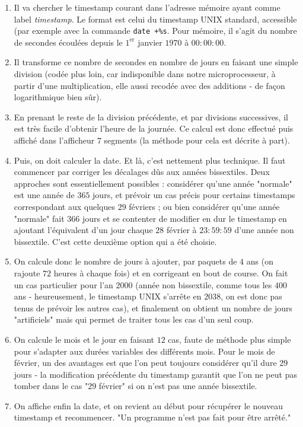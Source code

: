 \documentclass[13pt]{article}
\begin{document}
\begin{enumerate}
\item Il va chercher le timestamp courant dans l'adresse mémoire ayant comme label
   \emph{timestamp}. Le format est celui du timestamp UNIX standard, accessible (par
   exemple avec la commande \texttt{date +\%s}. Pour mémoire, il s'agit du nombre de
   secondes écoulées depuis le $1^{\text{er}}$ janvier $1970$ à $00:00:00$.\\
\item Il transforme ce nombre de secondes en nombre de jours en faisant une simple
   division (codée plus loin, car indisponible dans notre microprocesseur, à
   partir d'une multiplication, elle aussi recodée avec des additions - de façon
   logarithmique bien sûr).\\
\item En prenant le reste de la division précédente, et par divisions successives,
   il est très facile d'obtenir l'heure de la journée. Ce calcul est donc
   effectué puis affiché dans l'afficheur $7$ segments (la méthode pour cela est
   décrite à part).\\
\item Puis, on doit calculer la date. Et là, c'est nettement plus technique. Il
   faut commencer par corriger les décalages dûs aux années bissextiles. Deux
   approches sont essentiellement possibles : considérer qu'une année "normale"
   est une année de $365$ jours, et prévoir un cas précis pour certains timestamps
   correspondant aux quelques $29$ févriers ; ou bien considérer qu'une année
   "normale" fait $366$ jours et se contenter de modifier en dur le timestamp en
   ajoutant l'équivalent d'un jour chaque $28$ février à $23:59:59$ d'une année non
   bissextile. C'est cette deuxième option qui a été choisie.\\
\item On calcule donc le nombre de jours à ajouter, par paquets de $4$ ans (on
   rajoute $72$ heures à chaque fois) et en corrigeant en bout de course. On fait
   un cas particulier pour l'an $2000$ (année non bissextile, comme tous les $400$
   ans - heureusement, le timestamp UNIX s'arrête en $2038$, on est donc pas tenus
   de prévoir les autres cas), et finalement on obtient un nombre de jours
   "artificiels" mais qui permet de traiter tous les cas d'un seul coup.
\item On calcule le mois et le jour en faisant $12$ cas, faute de méthode plus simple
   pour s'adapter aux durées variables des différents mois. Pour le mois de
   février, un des avantages est que l'on peut toujours considérer qu'il dure $29$
   jours - la modification précédente du timestamp garantit que l'on ne peut pas
   tomber dans le cas "$29$ février" si on n'est pas une année bissextile.
\item On affiche enfin la date, et on revient au début pour récupérer le nouveau
   timestamp et recommencer. "Un programme n'est pas fait pour être arrêté."
\end{enumerate}
\end{document}
